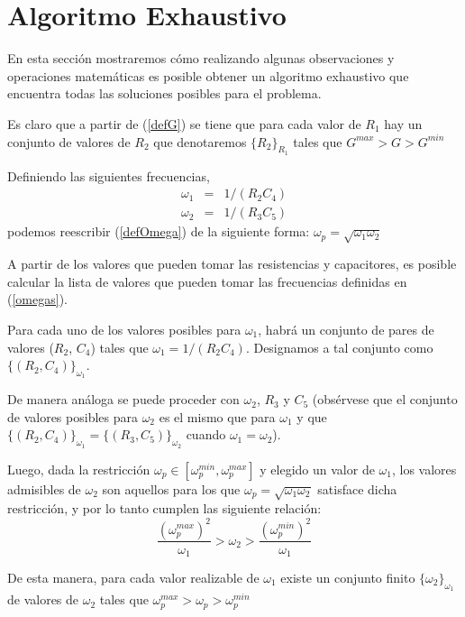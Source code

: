 \documentclass{llncs}
\begin{document}
	\section{\textbf{Algoritmo Exhaustivo}}
		\label{sec:AlgoritmoExhaustivo}
		En esta sección mostraremos cómo realizando algunas observaciones y operaciones matemáticas 
		es posible obtener un algoritmo exhaustivo que encuentra todas las soluciones posibles para el problema.
		
		Es claro que a partir de (\ref{defG}) se tiene que para cada valor de $R_1$ hay un conjunto de valores 
		de $R_2$ que denotaremos  $\{R_2\}_{R_1}$ tales que $G^{max} > G > G^{min}$
		
		Definiendo las siguientes frecuencias,
		\begin{eqnarray}
		\omega_1 &=& 1/(R_2 C_4) \nonumber \\
		\omega_2 &=& 1/(R_3 C_5)
		\label{omegas}
		\end{eqnarray}
		podemos reescribir (\ref{defOmega}) de la siguiente forma: $\omega_p = \sqrt{\omega_1  \omega_2}$
		
		A partir de los valores que pueden tomar las resistencias y capacitores, es posible calcular la lista de 
		valores que pueden tomar las frecuencias definidas en (\ref{omegas}).
		
		Para cada uno de los valores posibles para $\omega_1$, habrá un conjunto de pares de valores ($R_2$, $C_4$) tales que
		$\omega_1 = 1/(R_2 C_4)$. Designamos a tal conjunto como $\{(R_2,C_4)\}_{\omega_1}$. 
		
		De manera análoga se puede proceder con $\omega_2$, $R_3$ y $C_5$ (obsérvese que el conjunto de valores 
		posibles para $\omega_2$ es el mismo que para $\omega_1$ y que $\{(R_2,C_4)\}_{\omega_1}=\{(R_3,C_5)\}_{\omega_2}$ 
		cuando $\omega_1=\omega_2$). 
		
		Luego, dada la restricción $\omega_p \in  [\omega_p^{min},\omega_p^{max}]$ y 
		elegido un valor de  $\omega_1$, los valores admisibles de $\omega_2$ son aquellos para los que 
		$\omega_p= \sqrt{\omega_1 \omega_2}$ satisface dicha restricción, y por lo tanto cumplen las siguiente relación:
		\begin{equation*}
		\frac{(\omega_p^{max})^2}{\omega_1} > \omega_2 > \frac{(\omega_p^{min})^2}{\omega_1}
		\end{equation*}
		
		De esta manera, para cada valor realizable de $\omega_1$ existe un conjunto finito $\{{\omega_2}\}_{\omega_1}$ 
		de valores de $\omega_2$ tales que $ \omega_p^{max} > \omega_p > \omega_p^{min} $
		
\end{document}
